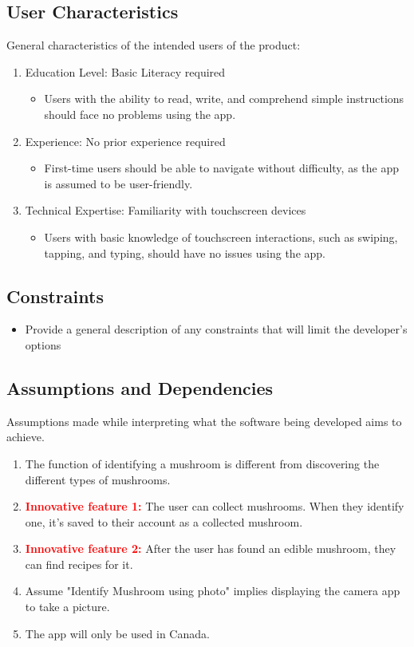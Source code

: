 \documentclass[]{article}
\begin{document}
\subsection{User Characteristics}
\label{sub:user_characteristics}
General characteristics of the intended users of the product:
\begin{enumerate}
	\item Education Level: Basic Literacy required
	\begin{itemize}
		\item Users with the ability to read, write, and comprehend simple instructions should face no problems using the app.
	\end{itemize}
	\item Experience: No prior experience required
	\begin{itemize}
		\item First-time users should be able to navigate without difficulty, as the app is assumed to be user-friendly.
	\end{itemize}
	\item Technical Expertise: Familiarity with touchscreen devices
	\begin{itemize}
		\item Users with basic knowledge of touchscreen interactions, such as swiping, tapping, and typing, should have no issues using the app.
	\end{itemize}
\end{enumerate}

\subsection{Constraints}
\label{sub:constraints}
\begin{itemize}
	\item Provide a general description of any constraints that will limit the developer's options
\end{itemize}

\subsection{Assumptions and Dependencies}
\label{sub:assumptions_and_dependencies}
Assumptions made while interpreting what the software being developed aims to achieve.
\begin{enumerate}
	\item The function of identifying a mushroom is different from discovering the different types of mushrooms.
	\item \textbf{\textcolor{red}{Innovative feature 1:}} The user can collect mushrooms. When they identify one, it's saved to their account as a collected mushroom.
	\item \textbf{\textcolor{red}{Innovative feature 2:}} After the user has found an edible mushroom, they can find recipes for it.
	\item Assume "Identify Mushroom using photo" implies displaying the camera app to take a picture.
	\item The app will only be used in Canada.
\end{enumerate}
\end{document}

